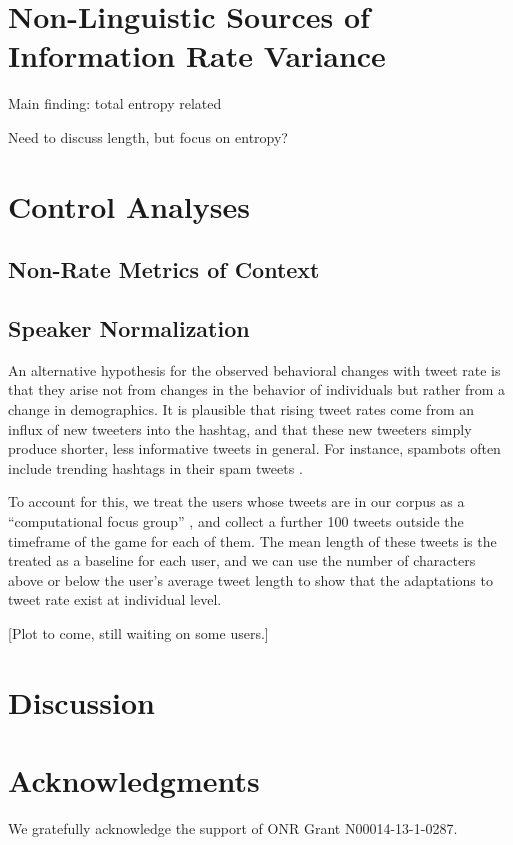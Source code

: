 \documentclass[11pt,letterpaper]{article}
\begin{document}
\section{Non-Linguistic Sources of Information Rate Variance}

Main finding: total entropy related 

Need to discuss length, but focus on entropy?


\section{Control Analyses}

\subsection{Non-Rate Metrics of Context}\label{sect:other-metrics}

\subsection{Speaker Normalization}
An alternative hypothesis for the observed behavioral changes with tweet rate is that they arise not from changes in the behavior of individuals but rather from a change in demographics.  It is plausible that rising tweet rates come from an influx of new tweeters into the hashtag, and that these new tweeters simply produce shorter, less informative tweets in general.  For instance, spambots often include trending hashtags in their spam tweets \cite{martinez2013}.

To account for this, we treat the users whose tweets are in our corpus as a ``computational focus group'' \cite{lin2013,lin2014}, and collect a further 100 tweets outside the timeframe of the game for each of them.  The mean length of these tweets is the treated as a baseline for each user, and we can use the number of characters above or below the user's average tweet length to show that the adaptations to tweet rate exist at individual level.

[Plot to come, still waiting on some users.]



\section{Discussion}


\section*{Acknowledgments}

We gratefully acknowledge the support of ONR Grant N00014-13-1-0287.



\end{document}
